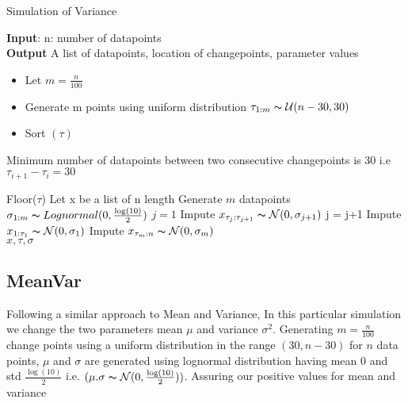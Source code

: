\documentclass{article}
\newcommand\tab[1][0.4cm]{\hspace*{#1}}
\begin{document}
\begin{algorithm}
\caption{Simulation of Variance}\label{alg:cap}
\textbf{Input}: n: number of datapoints\\
\textbf{Output} A list of datapoints, location of changepoints, parameter values
\begin{algorithmic}
\begin{itemize}
    \item  Let $ m = \frac{n}{100}$
    \item  Generate m points using uniform distribution $\tau_{1:m} \thicksim \mathcal{U} (n-30,30)$ 
    \item  Sort $(\tau)$
\end{itemize}
     \Ensure Minimum number of datapoints between two consecutive changepoints \tab \tab \tab \tab \quad is 30 i.e $\tau_{i+1} - \tau_{i} = 30$ 

\State Floor($\tau$)
\State Let x be a list of n length
\State Generate $m$ datapoints $\sigma_{1:m} \thicksim Lognormal(0,\frac{\log(10)}{2})$
\State $j = 1$
    \State Impute  $x_{\tau_{j} : \tau_{j+1}} \thicksim \mathcal{N}(0,\sigma_{j+1})$
    \State j = j+1
\EndWhile
\State Impute $x_{1:\tau_{1}} \thicksim \mathcal{N}(0,\sigma_{1})$
\State Impute $x_{\tau_{m}:n} \thicksim \mathcal{N}(0,\sigma_{m})$ \\
\Return $x,\tau,\sigma$
\end{algorithmic}
\end{algorithm}

\subsection{MeanVar}
Following a similar approach to Mean and Variance, In this particular simulation we change the two parameters mean $\mu$ and variance $\sigma^{2}$. Generating $m = \frac{n}{100}$ change points using a uniform distribution in the range $(30,n-30)$ for $n$ data points, $\mu$ and $\sigma$ are generated using lognormal distribution having mean 0 and std $\frac{\log(10)}{2}$ i.e. $(\mu. \sigma \thicksim \mathcal{N}(0,\frac{\log(10)}{2}))$. Assuring our positive values for mean and variance 
\end{document}
